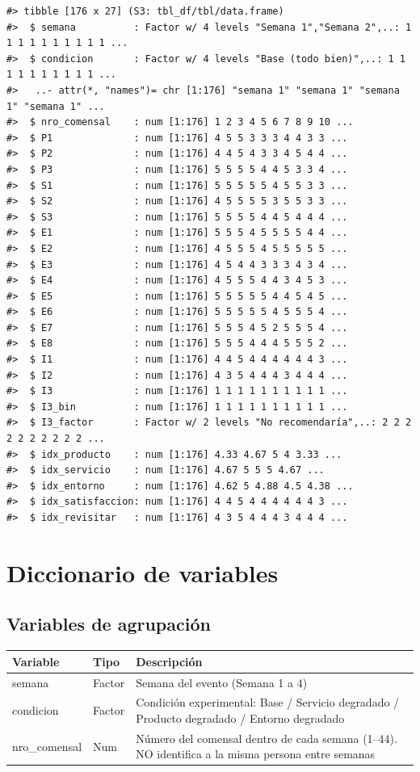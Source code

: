 \documentclass[
  spanish,
]{article}
\begin{document}
\begin{verbatim}
#> tibble [176 x 27] (S3: tbl_df/tbl/data.frame)
#>  $ semana          : Factor w/ 4 levels "Semana 1","Semana 2",..: 1 1 1 1 1 1 1 1 1 1 ...
#>  $ condicion       : Factor w/ 4 levels "Base (todo bien)",..: 1 1 1 1 1 1 1 1 1 1 ...
#>   ..- attr(*, "names")= chr [1:176] "semana 1" "semana 1" "semana 1" "semana 1" ...
#>  $ nro_comensal    : num [1:176] 1 2 3 4 5 6 7 8 9 10 ...
#>  $ P1              : num [1:176] 4 5 5 3 3 3 4 4 3 3 ...
#>  $ P2              : num [1:176] 4 4 5 4 3 3 4 5 4 4 ...
#>  $ P3              : num [1:176] 5 5 5 5 4 4 5 3 3 4 ...
#>  $ S1              : num [1:176] 5 5 5 5 5 4 5 5 3 3 ...
#>  $ S2              : num [1:176] 4 5 5 5 5 3 5 5 3 3 ...
#>  $ S3              : num [1:176] 5 5 5 5 4 4 5 4 4 4 ...
#>  $ E1              : num [1:176] 5 5 5 4 5 5 5 5 4 4 ...
#>  $ E2              : num [1:176] 4 5 5 5 4 5 5 5 5 5 ...
#>  $ E3              : num [1:176] 4 5 4 4 3 3 3 4 3 4 ...
#>  $ E4              : num [1:176] 4 5 5 5 4 4 3 4 5 3 ...
#>  $ E5              : num [1:176] 5 5 5 5 5 4 4 5 4 5 ...
#>  $ E6              : num [1:176] 5 5 5 5 5 4 5 5 5 4 ...
#>  $ E7              : num [1:176] 5 5 5 4 5 2 5 5 5 4 ...
#>  $ E8              : num [1:176] 5 5 5 4 4 4 5 5 5 2 ...
#>  $ I1              : num [1:176] 4 4 5 4 4 4 4 4 4 3 ...
#>  $ I2              : num [1:176] 4 3 5 4 4 4 3 4 4 4 ...
#>  $ I3              : num [1:176] 1 1 1 1 1 1 1 1 1 1 ...
#>  $ I3_bin          : num [1:176] 1 1 1 1 1 1 1 1 1 1 ...
#>  $ I3_factor       : Factor w/ 2 levels "No recomendaría",..: 2 2 2 2 2 2 2 2 2 2 ...
#>  $ idx_producto    : num [1:176] 4.33 4.67 5 4 3.33 ...
#>  $ idx_servicio    : num [1:176] 4.67 5 5 5 4.67 ...
#>  $ idx_entorno     : num [1:176] 4.62 5 4.88 4.5 4.38 ...
#>  $ idx_satisfaccion: num [1:176] 4 4 5 4 4 4 4 4 4 3 ...
#>  $ idx_revisitar   : num [1:176] 4 3 5 4 4 4 3 4 4 4 ...
\end{verbatim}

\section{Diccionario de variables}\label{diccionario-de-variables}

\subsection{Variables de agrupación}\label{variables-de-agrupaciuxf3n}

\begin{longtable}[t]{lll}
\toprule
Variable & Tipo & Descripción\\
\midrule
semana & Factor & Semana del evento (Semana 1 a 4)\\
condicion & Factor & Condición experimental: Base / Servicio degradado / Producto degradado / Entorno degradado\\
nro\_comensal & Num & Número del comensal dentro de cada semana (1–44). NO identifica a la misma persona entre semanas\\
\bottomrule
\end{longtable}
\end{document}
